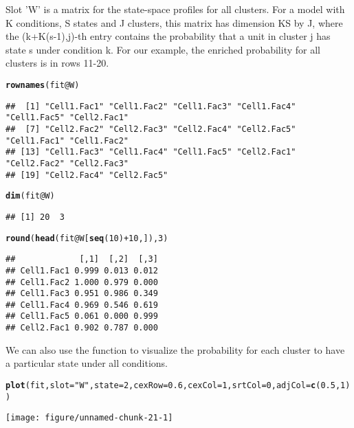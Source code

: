 \documentclass[a4paper,10pt]{article}\usepackage[]{graphicx}\usepackage[]{color}
\makeatletter
\def\maxwidth{ %
  \ifdim\Gin@nat@width>\linewidth
    \linewidth
  \else
    \Gin@nat@width
  \fi
}
\newcommand{\hlnum}[1]{\textcolor[rgb]{0.686,0.059,0.569}{#1}}%
\newcommand{\hlstr}[1]{\textcolor[rgb]{0.192,0.494,0.8}{#1}}%
\newcommand{\hlopt}[1]{\textcolor[rgb]{0,0,0}{#1}}%
\newcommand{\hlstd}[1]{\textcolor[rgb]{0.345,0.345,0.345}{#1}}%
\newcommand{\hlkwc}[1]{\textcolor[rgb]{0.333,0.667,0.333}{#1}}%
\newcommand{\hlkwd}[1]{\textcolor[rgb]{0.737,0.353,0.396}{\textbf{#1}}}%
\newenvironment{kframe}{%
 \def\at@end@of@kframe{}%
 \ifinner\ifhmode%
  \def\at@end@of@kframe{\end{minipage}}%
  \begin{minipage}{\columnwidth}%
 \fi\fi%
 \def\FrameCommand##1{\hskip\@totalleftmargin \hskip-\fboxsep
 \colorbox{shadecolor}{##1}\hskip-\fboxsep
     \hskip-\linewidth \hskip-\@totalleftmargin \hskip\columnwidth}%
 \MakeFramed {\advance\hsize-\width
   \@totalleftmargin\z@ \linewidth\hsize
   \@setminipage}}%
 {\par\unskip\endMakeFramed%
 \at@end@of@kframe}
\newenvironment{knitrout}{}{} %
\makeatother
\begin{document}
Slot 'W' is a matrix for the state-space profiles for all clusters. For a model with K conditions, S states and J clusters, this matrix has dimension KS by J, where the (k+K(s-1),j)-th entry contains the probability that a unit in cluster j has state s under condition k. For our example, the enriched probability for all clusters is in rows 11-20.

\begin{knitrout}
\color{fgcolor}\begin{kframe}
\begin{alltt}
\hlkwd{rownames}\hlstd{(fit}\hlopt{@}\hlkwc{W}\hlstd{)}
\end{alltt}
\begin{verbatim}
##  [1] "Cell1.Fac1" "Cell1.Fac2" "Cell1.Fac3" "Cell1.Fac4" "Cell1.Fac5" "Cell2.Fac1"
##  [7] "Cell2.Fac2" "Cell2.Fac3" "Cell2.Fac4" "Cell2.Fac5" "Cell1.Fac1" "Cell1.Fac2"
## [13] "Cell1.Fac3" "Cell1.Fac4" "Cell1.Fac5" "Cell2.Fac1" "Cell2.Fac2" "Cell2.Fac3"
## [19] "Cell2.Fac4" "Cell2.Fac5"
\end{verbatim}
\begin{alltt}
\hlkwd{dim}\hlstd{(fit}\hlopt{@}\hlkwc{W}\hlstd{)}
\end{alltt}
\begin{verbatim}
## [1] 20  3
\end{verbatim}
\begin{alltt}
\hlkwd{round}\hlstd{(}\hlkwd{head}\hlstd{(fit}\hlopt{@}\hlkwc{W}\hlstd{[}\hlkwd{seq}\hlstd{(}\hlnum{10}\hlstd{)} \hlopt{+} \hlnum{10}\hlstd{, ]),} \hlnum{3}\hlstd{)}
\end{alltt}
\begin{verbatim}
##             [,1]  [,2]  [,3]
## Cell1.Fac1 0.999 0.013 0.012
## Cell1.Fac2 1.000 0.979 0.000
## Cell1.Fac3 0.951 0.986 0.349
## Cell1.Fac4 0.969 0.546 0.619
## Cell1.Fac5 0.061 0.000 0.999
## Cell2.Fac1 0.902 0.787 0.000
\end{verbatim}
\end{kframe}
\end{knitrout}

We can also use the  function to visualize the probability for each cluster to have a particular state under all conditions.

\begin{knitrout}
\color{fgcolor}\begin{kframe}
\begin{alltt}
\hlkwd{plot}\hlstd{(fit,} \hlkwc{slot} \hlstd{=} \hlstr{"W"}\hlstd{,} \hlkwc{state} \hlstd{=} \hlnum{2}\hlstd{,} \hlkwc{cexRow} \hlstd{=} \hlnum{0.6}\hlstd{,} \hlkwc{cexCol} \hlstd{=} \hlnum{1}\hlstd{,} \hlkwc{srtCol} \hlstd{=} \hlnum{0}\hlstd{,} \hlkwc{adjCol} \hlstd{=} \hlkwd{c}\hlstd{(}\hlnum{0.5}\hlstd{,} \hlnum{1}\hlstd{))}
\end{alltt}
\end{kframe}

{\centering \texttt{[image: figure/unnamed-chunk-21-1]} 

}



\end{knitrout}
\end{document}
